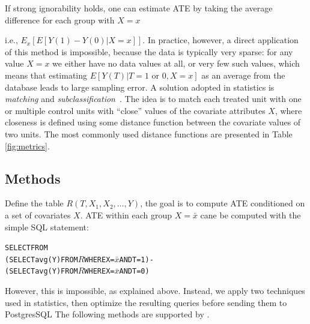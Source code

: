  If strong ignorability holds, one can estimate ATE by
 taking the  average difference for each group with $X=x$  i.e., $E_x[E[Y(1)-Y(0)| X=x]]$.
In practice, however, a direct application of this method is
impossible, because the data is typically very sparse: for any value
$X=x$ we either have no data values at all, or very few such values,
which means that estimating $E[Y(T)|T=1\mbox{ or }0,X=x]$ as an
average from the database leads to large sampling error. A solution adopted in statistics is {\em matching} and {\em  subclassification}~\cite{Rubin1983b}.  The idea is to match each treated unit with one or multiple control
units with ``close'' values of the covariate attributes $X$, where
closeness is defined using some distance function between the covariate values of two units.  The most
commonly used distance functions are presented  in Table \ref{fig:metrics}. 





\vspace{-0.3cm}
\subsection{Methods}
\label{sec:algo}
Define the table $R(T, X_1, X_2, \ldots, Y)$, the goal is to compute
ATE conditioned on a set of covariates $X$. ATE within each group $X = \bar{x}$
cane be computed with the simple SQL statement:
\vspace{-0.2cm}
\begin{alltt} \scriptsize
  SELECT FROM 
    (SELECT avg(Y) FROM \(R\) WHERE X = \(\bar{x}\) AND T=1) -
    (SELECT avg(Y) FROM \(R\)  WHERE X = \(\bar{x}\) AND T=0)
\end{alltt}

However, this is impossible, as explained above.
Instead, we apply two techniques used in statistics, then optimize
the resulting queries before sending them to PostgresSQL The following methods are supported by \GSQL.

